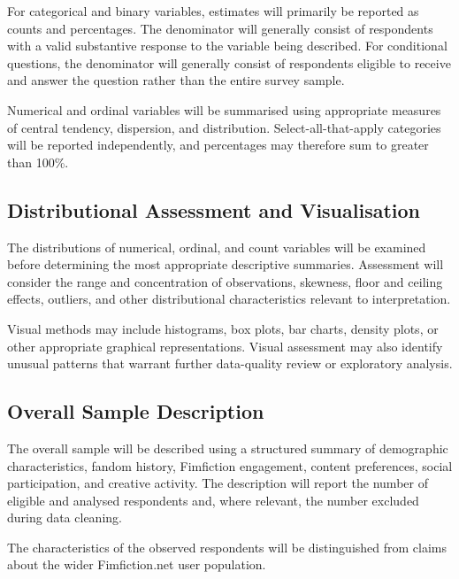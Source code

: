 For categorical and binary variables, estimates will primarily be reported as counts and percentages. The denominator will generally consist of respondents with a valid substantive response to the variable being described. For conditional questions, the denominator will generally consist of respondents eligible to receive and answer the question rather than the entire survey sample.

Numerical and ordinal variables will be summarised using appropriate measures of central tendency, dispersion, and distribution. Select-all-that-apply categories will be reported independently, and percentages may therefore sum to greater than 100\%.


\subsection{Distributional Assessment and Visualisation}

The distributions of numerical, ordinal, and count variables will be examined before determining the most appropriate descriptive summaries. Assessment will consider the range and concentration of observations, skewness, floor and ceiling effects, outliers, and other distributional characteristics relevant to interpretation.

Visual methods may include histograms, box plots, bar charts, density plots, or other appropriate graphical representations. Visual assessment may also identify unusual patterns that warrant further data-quality review or exploratory analysis.


\subsection{Overall Sample Description}

The overall sample will be described using a structured summary of demographic characteristics, fandom history, Fimfiction engagement, content preferences, social participation, and creative activity. The description will report the number of eligible and analysed respondents and, where relevant, the number excluded during data cleaning.

The characteristics of the observed respondents will be distinguished from claims about the wider Fimfiction.net user population.

